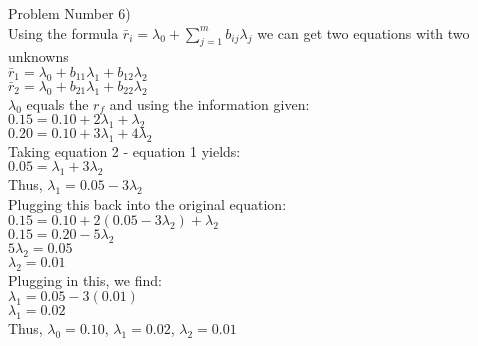\documentclass[11pt]{article}
\begin{document}
Problem Number 6)\\
Using the formula $\bar{r}_{i} = \lambda_{0} + \sum_{j = 1}^{m} b_{ij} \lambda_{j}$ we can get two equations with two unknowns\\
$\bar{r}_{1} = \lambda_{0} + b_{11} \lambda_{1} + b_{12} \lambda_{2}$\\
$\bar{r}_{2} = \lambda_{0} + b_{21} \lambda_{1} + b_{22} \lambda_{2}$\\
$\lambda_{0}$ equals the $r_{f}$ and using the information given:\\
$0.15 = 0.10 + 2 \lambda_{1} + \lambda_{2}$\\
$0.20 = 0.10 + 3 \lambda_{1} + 4 \lambda_{2}$\\
Taking equation 2 - equation 1 yields:\\
$0.05 = \lambda_{1} + 3 \lambda_{2}$\\
Thus, $\lambda_{1} = 0.05 - 3 \lambda_{2}$\\
Plugging this back into the original equation:\\
$0.15 = 0.10 + 2 (0.05 - 3 \lambda_{2}) + \lambda_{2}$\\
$0.15 = 0.20 - 5 \lambda_{2}$\\
$5 \lambda_{2} = 0.05$\\
$\lambda_{2} = 0.01$\\
Plugging in this, we find:\\
$\lambda_{1} = 0.05 - 3 (0.01)$\\
$\lambda_{1} = 0.02$\\
Thus, $\lambda_{0} = 0.10$, $\lambda_{1} = 0.02$, $\lambda_{2} = 0.01$\\
\end{document}
